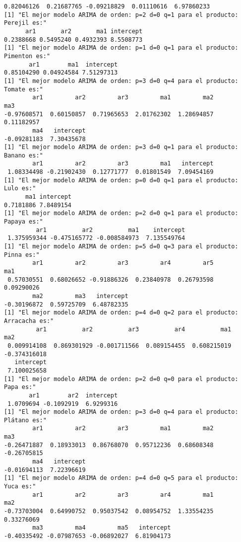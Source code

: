 \documentclass[11pt]{article}
\begin{document}
\begin{Verbatim}[commandchars=\\\{\}]
 0.82046126  0.21687765 -0.09218829  0.01110616  6.97860233 
[1] "El mejor modelo ARIMA de orden: p=2 d=0 q=1 para el producto: Perejil es:"
      ar1       ar2       ma1 intercept 
0.2388668 0.5495240 0.4932393 8.5508773 
[1] "El mejor modelo ARIMA de orden: p=1 d=0 q=1 para el producto: Pimenton es:"
       ar1        ma1  intercept 
0.85104290 0.04924584 7.51297313 
[1] "El mejor modelo ARIMA de orden: p=3 d=0 q=4 para el producto: Tomate es:"
        ar1         ar2         ar3         ma1         ma2         ma3 
-0.97608571  0.60150857  0.71965653  2.01762302  1.28694857  0.11182957 
        ma4   intercept 
-0.09281183  7.30435678 
[1] "El mejor modelo ARIMA de orden: p=3 d=0 q=1 para el producto: Banano es:"
        ar1         ar2         ar3         ma1   intercept 
 1.08334498 -0.21902430  0.12771777  0.01801549  7.09454169 
[1] "El mejor modelo ARIMA de orden: p=0 d=0 q=1 para el producto: Lulo es:"
      ma1 intercept 
0.7181886 7.8489154 
[1] "El mejor modelo ARIMA de orden: p=2 d=0 q=1 para el producto: Papaya es:"
         ar1          ar2          ma1    intercept 
 1.375959344 -0.475165772 -0.008584973  7.135549764 
[1] "El mejor modelo ARIMA de orden: p=5 d=0 q=3 para el producto: Pinna es:"
        ar1         ar2         ar3         ar4         ar5         ma1 
 0.57030551  0.68026652 -0.91886326  0.23840978  0.26793598  0.09290026 
        ma2         ma3   intercept 
-0.30196872  0.59725709  6.48782335 
[1] "El mejor modelo ARIMA de orden: p=4 d=0 q=2 para el producto: Arracacha es:"
         ar1          ar2          ar3          ar4          ma1          ma2 
 0.009914108  0.869301929 -0.001711566  0.089154455  0.608215019 -0.374316018 
   intercept 
 7.100025658 
[1] "El mejor modelo ARIMA de orden: p=2 d=0 q=0 para el producto: Papa es:"
       ar1        ar2  intercept 
 1.0709694 -0.1092919  6.9299316 
[1] "El mejor modelo ARIMA de orden: p=3 d=0 q=4 para el producto: Plátano es:"
        ar1         ar2         ar3         ma1         ma2         ma3 
-0.26471887  0.18933013  0.86768070  0.95712236  0.68608348 -0.26705815 
        ma4   intercept 
-0.01694113  7.22396619 
[1] "El mejor modelo ARIMA de orden: p=4 d=0 q=5 para el producto: Yuca es:"
        ar1         ar2         ar3         ar4         ma1         ma2 
-0.73703004  0.64990752  0.95037542  0.08954752  1.33554235  0.33276069 
        ma3         ma4         ma5   intercept 
-0.40335492 -0.07987653 -0.06892027  6.81904173 

    \end{Verbatim}
\end{document}
